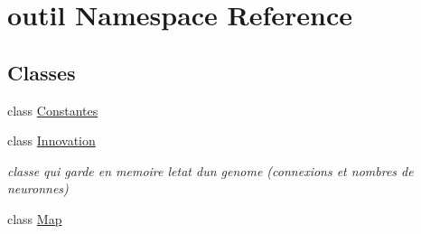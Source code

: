 \hypertarget{namespaceoutil}{}\section{outil Namespace Reference}
\label{namespaceoutil}
\subsection*{Classes}
\begin{DoxyCompactItemize}
\item 
class \hyperlink{classoutil_1_1_constantes}{Constantes}
\item 
class \hyperlink{classoutil_1_1_innovation}{Innovation}
\begin{DoxyCompactList}\small\item\em classe qui garde en memoire l\textquotesingle{}etat d\textquotesingle{}un genome (connexions et nombres de neuronnes) \end{DoxyCompactList}\item 
class \hyperlink{classoutil_1_1_map}{Map}
\end{DoxyCompactItemize}
